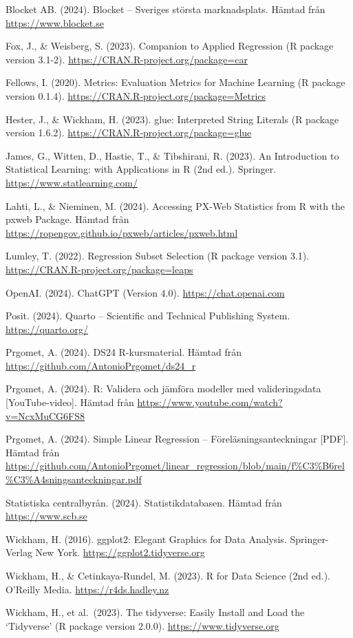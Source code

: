 \documentclass[
  letterpaper,
  DIV=11,
  numbers=noendperiod]{scrreprt}
\begin{document}
Blocket AB. (2024). Blocket -- Sveriges största marknadsplats. Hämtad
från \url{https://www.blocket.se}

Fox, J., \& Weisberg, S. (2023). Companion to Applied Regression (R
package version 3.1-2). \url{https://CRAN.R-project.org/package=car}

Fellows, I. (2020). Metrics: Evaluation Metrics for Machine Learning (R
package version 0.1.4). \url{https://CRAN.R-project.org/package=Metrics}

Hester, J., \& Wickham, H. (2023). glue: Interpreted String Literals (R
package version 1.6.2). \url{https://CRAN.R-project.org/package=glue}

James, G., Witten, D., Hastie, T., \& Tibshirani, R. (2023). An
Introduction to Statistical Learning: with Applications in R (2nd ed.).
Springer. \url{https://www.statlearning.com/}

Lahti, L., \& Nieminen, M. (2024). Accessing PX-Web Statistics from R
with the pxweb Package. Hämtad från
\url{https://ropengov.github.io/pxweb/articles/pxweb.html}

Lumley, T. (2022). Regression Subset Selection (R package version 3.1).
\url{https://CRAN.R-project.org/package=leaps}

OpenAI. (2024). ChatGPT (Version 4.0). \url{https://chat.openai.com}

Posit. (2024). Quarto -- Scientific and Technical Publishing System.
\url{https://quarto.org/}

Prgomet, A. (2024). DS24 R-kursmaterial. Hämtad från
\url{https://github.com/AntonioPrgomet/ds24_r}

Prgomet, A. (2024). R: Validera och jämföra modeller med valideringsdata
{[}YouTube-video{]}. Hämtad från
\url{https://www.youtube.com/watch?v=NcxMuCG6FS8}

Prgomet, A. (2024). Simple Linear Regression -- Föreläsningsanteckningar
{[}PDF{]}. Hämtad från
\url{https://github.com/AntonioPrgomet/linear_regression/blob/main/f%C3%B6rel%C3%A4sningsanteckningar.pdf}%

Statistiska centralbyrån. (2024). Statistikdatabasen. Hämtad från
\url{https://www.scb.se}

Wickham, H. (2016). ggplot2: Elegant Graphics for Data Analysis.
Springer-Verlag New York. \url{https://ggplot2.tidyverse.org}

Wickham, H., \& Cetinkaya-Rundel, M. (2023). R for Data Science (2nd
ed.). O'Reilly Media. \url{https://r4ds.hadley.nz}

Wickham, H., et al.~(2023). The tidyverse: Easily Install and Load the
`Tidyverse' (R package version 2.0.0). \url{https://www.tidyverse.org}
\end{document}

